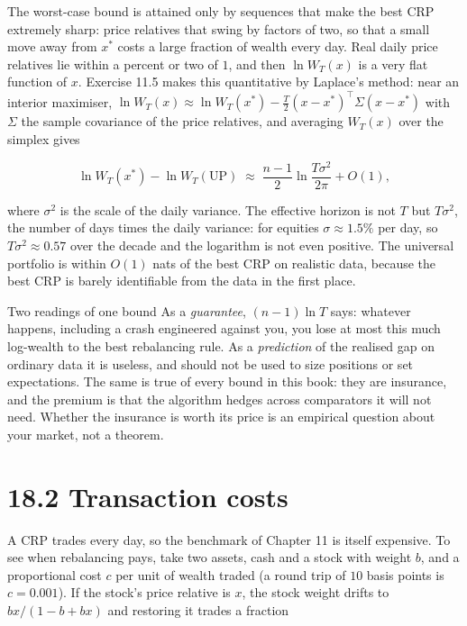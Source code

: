 \documentclass[11pt,a4paper,openany]{book}
\begin{document}
The worst-case bound is attained only by sequences that make the best CRP extremely sharp: price relatives that swing by factors of two, so that a small move away from $x^*$ costs a large fraction of wealth every day. Real daily price relatives lie within a percent or two of $1$, and then $\ln W_T(x)$ is a very flat function of $x$. Exercise 11.5 makes this quantitative by Laplace's method: near an interior maximiser, $\ln W_T(x)\approx\ln W_T(x^*)-\tfrac T2(x-x^*)^\top\Sigma(x-x^*)$ with $\Sigma$ the sample covariance of the price relatives, and averaging $W_T(x)$ over the simplex gives

\[\ln W_T(x^*)-\ln W_T(\mathrm{UP})\;\approx\;\frac{n-1}2\ln\frac{T\sigma^2}{2\pi}+O(1),\]

where $\sigma^2$ is the scale of the daily variance. The effective horizon is not $T$ but $T\sigma^2$, the number of days times the daily variance: for equities $\sigma\approx1.5\%$ per day, so $T\sigma^2\approx0.57$ over the decade and the logarithm is not even positive. The universal portfolio is within $O(1)$ nats of the best CRP on realistic data, because the best CRP is barely identifiable from the data in the first place.

\begin{bwarn}{Two readings of one bound}
As a \emph{guarantee}, $(n-1)\ln T$ says: whatever happens, including a crash engineered against you, you lose at most this much log-wealth to the best rebalancing rule. As a \emph{prediction} of the realised gap on ordinary data it is useless, and should not be used to size positions or set expectations. The same is true of every bound in this book: they are insurance, and the premium is that the algorithm hedges across comparators it will not need. Whether the insurance is worth its price is an empirical question about your market, not a theorem.
\end{bwarn}

\section*{18.2 Transaction costs}\label{ch18-costs}

A CRP trades every day, so the benchmark of Chapter 11 is itself expensive. To see when rebalancing pays, take two assets, cash and a stock with weight $b$, and a proportional cost $c$ per unit of wealth traded (a round trip of $10$ basis points is $c=0.001$). If the stock's price relative is $x$, the stock weight drifts to $bx/(1-b+bx)$ and restoring it trades a fraction
\end{document}
